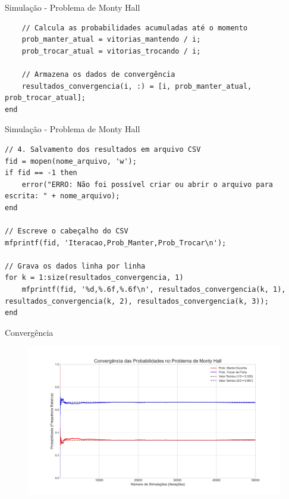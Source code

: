 \begin{frame}[fragile]{Simulação - Problema de Monty Hall}
\begin{lstlisting}
    // Calcula as probabilidades acumuladas até o momento
    prob_manter_atual = vitorias_mantendo / i;
    prob_trocar_atual = vitorias_trocando / i;

    // Armazena os dados de convergência
    resultados_convergencia(i, :) = [i, prob_manter_atual, prob_trocar_atual];
end      
\end{lstlisting}

\end{frame}

\begin{frame}[fragile]{Simulação - Problema de Monty Hall}
\begin{lstlisting}
// 4. Salvamento dos resultados em arquivo CSV
fid = mopen(nome_arquivo, 'w');
if fid == -1 then
    error("ERRO: Não foi possível criar ou abrir o arquivo para escrita: " + nome_arquivo);
end

// Escreve o cabeçalho do CSV
mfprintf(fid, 'Iteracao,Prob_Manter,Prob_Trocar\n');

// Grava os dados linha por linha
for k = 1:size(resultados_convergencia, 1)
    mfprintf(fid, '%d,%.6f,%.6f\n', resultados_convergencia(k, 1), resultados_convergencia(k, 2), resultados_convergencia(k, 3));
end
\end{lstlisting}
\end{frame}

\begin{frame}[fragile]{Convergência}
 \begin{figure}
    \centering
    \includegraphics[width=0.9\linewidth]{figures/convergencia_monty_hall.png}
 \end{figure}
\end{frame}

